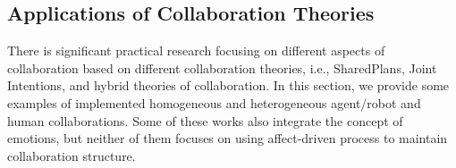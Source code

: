 \documentclass[12pt]{report}
\begin{document}

\subsection{Applications of Collaboration Theories}
\label{sec:applicaiton}

There is significant practical research focusing on different aspects of
collaboration based on different collaboration theories, i.e., SharedPlans,
Joint Intentions, and hybrid theories of collaboration. In this section, we
provide some examples of implemented homogeneous and heterogeneous agent/robot
and human collaborations. Some of these works also integrate the concept of
emotions, but neither of them focuses on using affect-driven process to maintain
collaboration structure.
\end{document}

